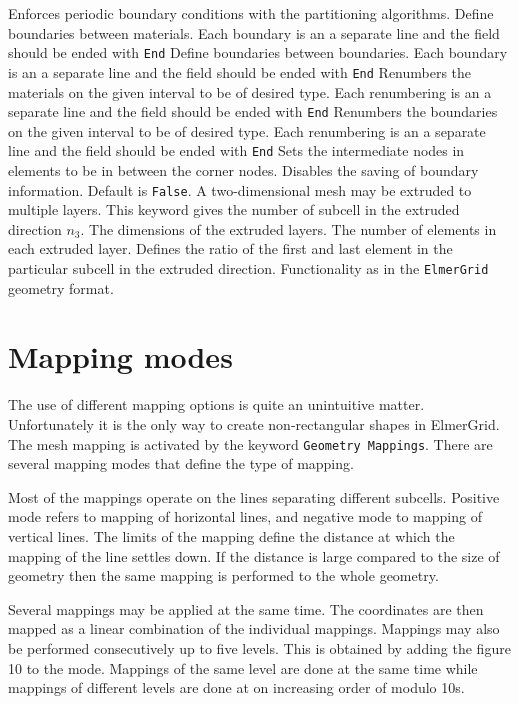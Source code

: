 Enforces periodic boundary conditions with the partitioning algorithms.
%
Define boundaries between materials. 
Each boundary is an a separate line
and the field should be ended with \texttt{End}
%
Define boundaries between boundaries.
Each boundary is an a separate line
and the field should be ended with \texttt{End}
%
Renumbers the materials on the given interval to be of desired type.
Each renumbering is an a separate line
and the field should be ended with \texttt{End}
%
Renumbers the boundaries on the given interval to be of desired type.
Each renumbering is an a separate line
and the field should be ended with \texttt{End}
%
Sets the intermediate nodes in elements to be in between 
the corner nodes.
%
Disables the saving of boundary information.
Default is \texttt{False}.
%
A two-dimensional mesh may be extruded to multiple layers. This
keyword gives the number of subcell in the extruded direction $n_3$.
The dimensions of the extruded layers.
The number of elements in each extruded layer.
Defines the ratio of the first and last element in the particular
subcell in the extruded direction.
Functionality as in the \texttt{ElmerGrid} geometry format.
%
\sifend



\section{Mapping modes}
The use of different mapping options is quite an 
unintuitive matter. Unfortunately it is the only way to 
create non-rectangular shapes in ElmerGrid. 
The mesh mapping is activated by the keyword \texttt{Geometry Mappings}.
There are several mapping modes that define the type of mapping.

Most of the mappings operate on the lines separating different subcells.
Positive mode refers to mapping of horizontal lines, 
and negative mode to mapping of vertical lines.
The limits of the mapping define the distance at which the 
mapping of the line settles down. If the distance is large compared to 
the size of geometry then the same mapping is performed to the 
whole geometry. 

Several mappings may be applied at the same time. The 
coordinates are then mapped as a linear combination of the 
individual mappings. Mappings may also be performed 
consecutively up to five levels. This is obtained by adding 
the figure 10 to the mode. Mappings of the same 
level are done at the same time while mappings of different levels
are done at on increasing order of modulo 10s.

